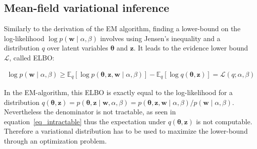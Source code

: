\documentclass[12pt,a4paper,onecolumn]{article}
\begin{document}
\subsection{Mean-field variational inference}

Similarly to the derivation of the EM algorithm, finding a lower-bound on the log-likelihood \(\log p(\bm{w} \mid \alpha, \beta)\) involves using Jensen's inequality and a distribution \(q\) over latent variables \(\bm{\theta}\) and \(\bm{z}\). It leads to the evidence lower bound \(\mathcal{L}\), called ELBO:

\begin{align}
	\log p(\bm{w} \mid \alpha, \beta) \geq \mathbb{E}_q[\log p(\bm{\theta}, \bm{z}, \bm{w} \mid \alpha, \beta)] - \mathbb{E}_q[\log q(\bm{\theta},\bm{z})] = \mathcal{L}(q ; \alpha, \beta) \label{eq_llh}
\end{align}

In the EM-algorithm, this ELBO is exactly equal to the log-likelihood for a distribution \(q(\bm{\theta}, \bm{z}) = p(\bm{\theta}, \bm{z} \mid \bm{w}, \alpha, \beta) =p(\bm{\theta}, \bm{z}, \bm{w} \mid \alpha, \beta) / p(\bm{w} \mid \alpha, \beta)\). Nevertheless the denominator is not tractable, as seen in equation~\eqref{eq_intractable} thus the expectation under \(q(\bm{\theta}, \bm{z})\) is not computable. Therefore a variational distribution has to be used to maximize the lower-bound through an optimization problem.
\end{document}
